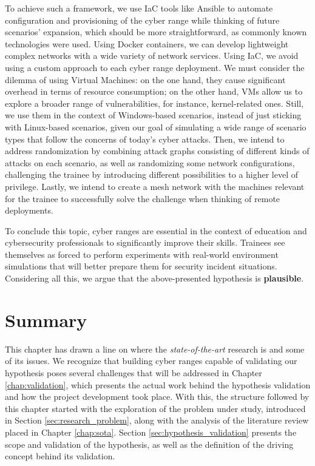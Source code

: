 To achieve such a framework, we use IaC tools like Ansible to automate configuration and provisioning of the cyber range while thinking of future scenarios' expansion, which should be more straightforward, as commonly known technologies were used. Using Docker containers, we can develop lightweight complex networks with a wide variety of network services. Using IaC, we avoid using a custom approach to each cyber range deployment. We must consider the dilemma of using Virtual Machines: on the one hand, they cause significant overhead in terms of resource consumption; on the other hand, VMs allow us to explore a broader range of vulnerabilities, for instance, kernel-related ones. Still, we use them in the context of Windows-based scenarios, instead of just sticking with Linux-based scenarios, given our goal of simulating a wide range of scenario types that follow the concerns of today's cyber attacks. Then, we intend to address randomization by combining attack graphs consisting of different kinds of attacks on each scenario, as well as randomizing some network configurations, challenging the trainee by introducing different possibilities to a higher level of privilege. Lastly, we intend to create a mesh network with the machines relevant for the trainee to successfully solve the challenge when thinking of remote deployments.

To conclude this topic, cyber ranges are essential in the context of education and cybersecurity professionals to significantly improve their skills. Trainees see themselves as forced to perform experiments with real-world environment simulations that will better prepare them for security incident situations. Considering all this, we argue that the above-presented hypothesis is \textbf{plausible}.

\section{Summary} \label{sec:problem_summary}

This chapter has drawn a line on where the \textit{state-of-the-art} research is and some of its issues. We recognize that building cyber ranges capable of validating our hypothesis poses several challenges that will be addressed in Chapter \ref{chap:validation}, which presents the actual work behind the hypothesis validation and how the project development took place. With this, the structure followed by this chapter started with the exploration of the problem under study, introduced in Section \ref{sec:research_problem}, along with the analysis of the literature review placed in Chapter \ref{chap:sota}. Section \ref{sec:hypothesis_validation} presents the scope and validation of the hypothesis, as well as the definition of the driving concept behind its validation.